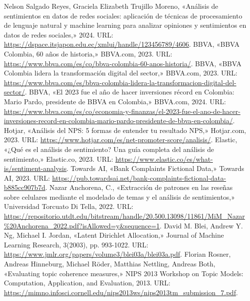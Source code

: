 \documentclass{matematicasud}
\begin{document}
\begin{thebibliography}{99}
\sloppy  
{} Nelson Salgado Reyes, Graciela Elizabeth Trujillo Moreno, «Análisis de sentimientos en datos de redes sociales: aplicación de técnicas de procesamiento de lenguaje natural y machine learning para analizar opiniones y sentimientos en datos de redes sociales,» 2024. URL: \url{https://dspace.itsjapon.edu.ec/xmlui/handle/123456789/4606}.
 BBVA, «BBVA Colombia, 60 años de historia,» BBVA.com, 2023. URL: \url{https://www.bbva.com/es/co/bbva-colombia-60-anos-historia/}.
 BBVA, «BBVA Colombia lidera la transformación digital del sector,» BBVA.com, 2023. URL: \url{https://www.bbva.com/es/bbva-colombia-lidera-la-transformacion-digital-del-sector/}.
 BBVA, «El 2023 fue el año de hacer inversiones récord en Colombia: Mario Pardo, presidente de BBVA en Colombia,» BBVA.com, 2024. URL: \\\url{https://www.bbva.com/es/co/economia-y-finanzas/el-2023-fue-el-ano-de-hacer-inversiones-record-en-colombia-mario-pardo-presidente-de-bbva-en-colombia/}.
 Hotjar, «Análisis del NPS: 5 formas de entender tu resultado NPS,» Hotjar.com, 2023. URL: \url{https://www.hotjar.com/es/net-promoter-score/analisis/}.
 Elastic, «¿Qué es el análisis de sentimiento? Una guía completa del análisis de sentimiento,» Elastic.co, 2023. URL: \url{https://www.elastic.co/es/what-is/sentiment-analysis}.
 Towards AI, «Bank Complaints Fictional Data,» Towards AI, 2023. URL: \url{https://pub.towardsai.net/bank-complaints-fictional-data-b885cc907b7d}.
 Nazar Anchorena, C., «Extracción de patrones en las reseñas sobre celulares mediante el modelado de temas y el análisis de sentimientos,» Universidad Torcuato Di Tella, 2022. URL: \url{https://repositorio.utdt.edu/bitstream/handle/20.500.13098/11861/MiM_Nazar%20Anchorena_2022.pdf?isAllowed=y&sequence=1}.
 David M. Blei, Andrew Y. Ng, Michael I. Jordan, «Latent Dirichlet Allocation,» Journal of Machine Learning Research, 3(2003), pp. 993-1022. URL: \url{https://www.jmlr.org/papers/volume3/blei03a/blei03a.pdf}.
 Florian Rosner, Andreas Hinneburg, Michael Röder, Matthias Nettling, Andreas Both, «Evaluating topic coherence measures,» NIPS 2013 Workshop on Topic Models: Computation, Application, and Evaluation, 2013. URL: \url{https://mimno.infosci.cornell.edu/nips2013ws/nips2013tm_submission_7.pdf}.
\end{thebibliography}
\end{document}
